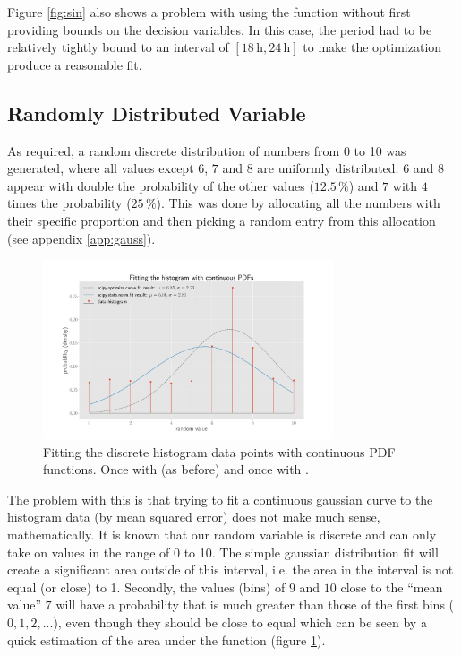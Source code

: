 \documentclass[10pt, a4paper]{article}
\begin{document}
Figure \ref{fig:sin} also shows a problem with using the  function without first providing bounds on the decision variables. In this case, the period had to be relatively tightly bound to an interval of $[18\,\si{\hour},24\,\si{\hour}]$ to make the optimization produce a reasonable fit.


\subsection{Randomly Distributed Variable}
As required, a random discrete distribution of numbers from 0 to 10 was generated, where all values except $6$, $7$ and $8$ are uniformly distributed. $6$ and $8$ appear with double the probability of the other values ($12.5\,\si{\percent}$) and $7$ with $4$ times the probability ($25\,\si{\percent}$). This was done by allocating all the numbers with their specific proportion and then picking a random entry from this allocation (see appendix \ref{app:gauss}). %

\begin{figure}[h]
  \centering
  \includegraphics[width=0.764\textwidth]{graphics/gauss_cont.pdf}
  \caption{Fitting the discrete histogram data points with continuous PDF functions. Once with  (as before) and once with .}\label{fig:gauss1}
\end{figure}


The problem with this is that trying to fit a continuous gaussian curve to the histogram data (by mean squared error) does not make much sense, mathematically. It is known that our random variable is discrete and can only take on values in the range of 0 to 10. The simple gaussian distribution fit will create a significant area outside of this interval, i.e. the area in the interval is not equal (or close) to 1. Secondly, the values (bins) of $9$ and $10$ close to the ``mean value'' $7$ will have a probability that is much greater than those of the first bins ($0, 1, 2, ...$), even though they should be close to equal which can be seen by a quick estimation of the area under the function (figure \ref{fig:gauss1}).\\
\end{document}
